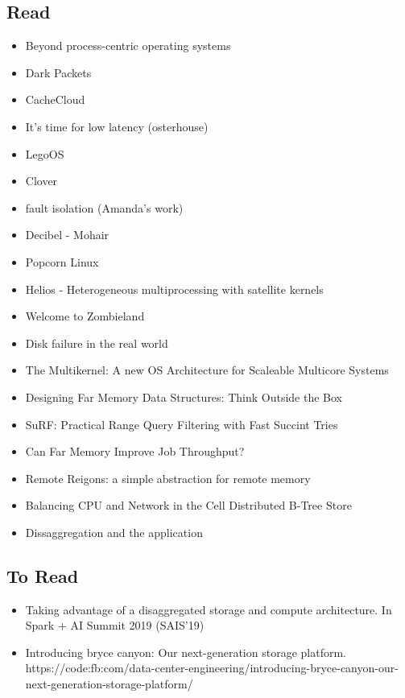 \subsection{Read}
\begin{itemize}
    \item{Beyond process-centric operating systems}~\cite{189914}\rpaper{}
    \item{Dark Packets}\rabstract{}
    \item{CacheCloud}~\cite{cachecloud}\rintro{+}
    \item{It's time for low latency (osterhouse)}
    \item{LegoOS}\cite{legoos}\rpaper{}
    \item {Clover}\cite{clover}\rpaper{}
    \item{fault isolation (Amanda's work)}\rintro{}
    \item{Decibel - Mohair}\rabstract{}
    \item{Popcorn Linux}
    \item{Helios - Heterogeneous multiprocessing with satellite kernels}~\cite{helios}\rabstract{}
    \item{Welcome to Zombieland}~\cite{zombieland}\rintro{}
    \item{Disk failure in the real world}~\cite{Schroeder:2007:DFR:1267903.1267904}\rabstract{}
    \item{The Multikernel: A new OS Architecture for Scaleable Multicore Systems}~\cite{the-multikenel}\rabstract{}
    \item{Designing Far Memory Data Structures: Think Outside the Box}~\cite{aguilera2019designing}
    \item{SuRF: Practical Range Query Filtering with Fast Succint Tries}~\cite{surf}\rabstract{}
    \item{Can Far Memory Improve Job Throughput?}~\cite{10.1145/3342195.3387522}
    \item{Remote Reigons: a simple abstraction for remote memory}~\cite{215933}
    \item{Balancing CPU and Network in the Cell Distributed B-Tree Store}~\cite{cell}
    \item{Dissaggregation and the application}~\cite{254120}

\end{itemize}

\subsection{To Read}
\begin{itemize}
    \item{Taking advantage of a disaggregated storage and compute architecture. In Spark + AI Summit 2019 (SAIS'19)}
    \item{Introducing bryce canyon: Our next-generation storage platform. https://code:fb:com/data-center-engineering/introducing-bryce-canyon-our-next-generation-storage-platform/ }

\end{itemize}


